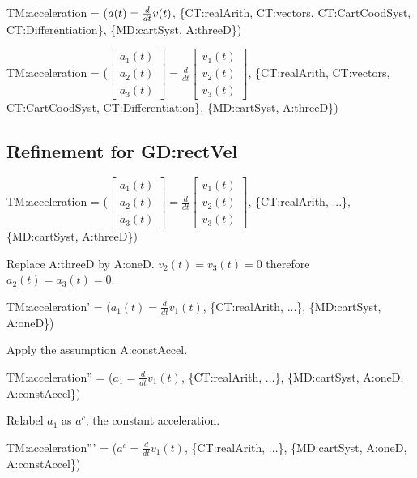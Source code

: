 \documentclass{article}
\begin{document}
\noindent TM:acceleration = ($a(t) = \frac{d}{dt} v(t)\\$, \{CT:realArith,
CT:vectors, CT:CartCoodSyst, CT:Differentiation\}, \{MD:cartSyst, A:threeD\})

\noindent TM:acceleration = ($
    \left [ 
    \begin{array}{c}
    a_1(t)\\
    a_2(t)\\
    a_3(t) 
    \end{array} 
    \right ] =
    \frac{d}{dt}
    \left [ 
    \begin{array}{c}
    v_1(t)\\
    v_2(t)\\
    v_3(t) 
    \end{array} 
    \right ]
    $, \{CT:realArith, CT:vectors, CT:CartCoodSyst, CT:Differentiation\}, \{MD:cartSyst, A:threeD\})
    
\subsection{Refinement for GD:rectVel}

TM:acceleration = ($
    \left [ 
    \begin{array}{c}
    a_1(t)\\
    a_2(t)\\
    a_3(t) 
    \end{array} 
    \right ] =
    \frac{d}{dt}
    \left [ 
    \begin{array}{c}
    v_1(t)\\
    v_2(t)\\
    v_3(t) 
    \end{array} 
    \right ]
    $, \{CT:realArith, ...\}, \{MD:cartSyst, A:threeD\})

\noindent Replace A:threeD by A:oneD.  $v_2(t) = v_3(t) = 0$ therefore $a_2(t) = a_3(t) = 0$.

TM:acceleration' = ($a_1(t) = \frac{d}{dt} v_1(t)$, \{CT:realArith,
...\}, \{MD:cartSyst, A:oneD\})

\noindent Apply the assumption A:constAccel.

TM:acceleration'' = ($a_1 = \frac{d}{dt} v_1(t)$, \{CT:realArith,
...\}, \{MD:cartSyst, A:oneD, A:constAccel\})

\noindent Relabel $a_1$ as $a^c$, the constant acceleration.

TM:acceleration''' = ($a^c = \frac{d}{dt} v_1(t)$, \{CT:realArith,
...\}, \{MD:cartSyst, A:oneD, A:constAccel\})
\end{document}
